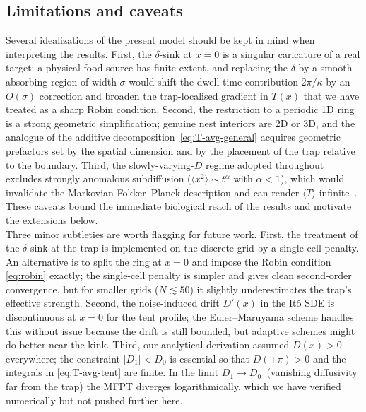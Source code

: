 \subsection{Limitations and caveats} 
Several idealizations of the present model should be kept in mind when interpreting the results.  First, the $\delta$-sink at $x=0$ is a singular caricature of a real target: a physical food source has finite extent, and replacing the $\delta$ by a smooth absorbing region of width $\sigma$ would shift the dwell-time contribution $2\pi/\kappa$ by an $O(\sigma)$ correction and broaden the trap-localised gradient in $T(x)$ that we have treated as a sharp Robin condition.  Second, the restriction to a periodic 1D ring is a strong geometric simplification; genuine nest interiors are 2D or 3D, and the analogue of the additive decomposition~\eqref{eq:T-avg-general} acquires geometric prefactors set by the spatial dimension and by the placement of the trap relative to the boundary. Third, the slowly-varying-$D$ regime adopted throughout excludes strongly anomalous subdiffusion ($\langle x^2\rangle\sim t^\alpha$ with $\alpha<1$), which would invalidate the Markovian Fokker--Planck description and can render $\langle T\rangle$ infinite~\cite{Metzler2000}.  These caveats bound the immediate biological reach of the results and motivate the extensions below.\\

Three minor subtleties are worth flagging for future work.  First, the
treatment of the $\delta$-sink at the trap is implemented on the discrete grid
by a single-cell penalty.  An alternative is to split the ring at $x=0$ and
impose the Robin condition \eqref{eq:robin} exactly; the single-cell
penalty is simpler and gives clean second-order convergence, but for smaller
grids ($N\lesssim 50$) it slightly underestimates the trap's effective strength.
Second, the noise-induced drift $D'(x)$ in the It\^o SDE is discontinuous at
$x=0$ for the tent profile; the Euler--Maruyama scheme handles this without
issue because the drift is still bounded, but adaptive schemes might do better
near the kink.  Third, our analytical derivation assumed $D(x)>0$ everywhere;
the constraint $|D_1|<D_0$ is essential so that $D(\pm\pi)>0$ and the integrals
in \eqref{eq:T-avg-tent} are finite.  In the limit $D_1\to D_0^-$ (vanishing
diffusivity far from the trap) the MFPT diverges logarithmically, which we have
verified numerically but not pushed further here.
